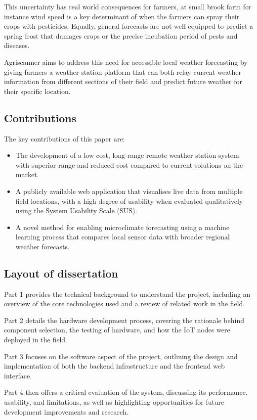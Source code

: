 This uncertainty has real world consequences for farmers, at small brook farm
for instance wind speed is a key determinant of when the farmers can spray their
crops with pesticides. Equally, general forecasts are not well equipped to
predict a spring frost that damages crops or the precise incubation period of
pests and diseases.

Agriscanner aims to address this need for accessible local weather forecasting
by giving farmers a weather station platform that can both relay current weather
information from different sections of their field and predict future weather
for their specific location. 

\subsection{Contributions}

The key contributions of this paper are:

\begin{itemize}
    \item The development of a low cost, long-range remote weather station
    system with superior range and reduced cost compared to current solutions on
    the market.
    \item A publicly available web application that visualises live data from
    multiple field locations, with a high degree of usability when evaluated
    qualitatively using the System Usability Scale (SUS).
    \item A novel method for enabling microclimate forecasting using a machine
    learning process that compares local sensor data with broader regional
    weather forecasts.
\end{itemize}

\subsection{Layout of dissertation}

Part 1 provides the technical background to understand the project, including an
overview of the core technologies used and a review of related work in the
field.

Part 2 details the hardware development process, covering the rationale behind
component selection, the testing of hardware, and how the IoT nodes were
deployed in the field.

Part 3 focuses on the software aspect of the project, outlining the design and
implementation of both the backend infrastructure and the frontend web
interface.

Part 4 then offers a critical evaluation of the system, discussing its
performance, usability, and limitations, as well as highlighting opportunities
for future development improvements and research. 